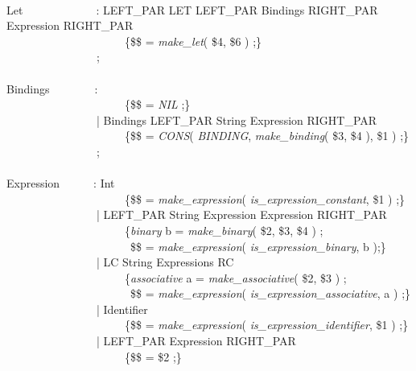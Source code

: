 \begin{pgm}
 \\
Let~~~~~~~~~~~~~: LEFT\_PAR LET LEFT\_PAR Bindings 
                                RIGHT\_PAR Expression RIGHT\_PAR \\
~~~~~~~~~~~~~~~~~~~~~\{\$\$ = {\sl make\_let}( \$4, \$6 ) ;\} \\
~~~~~~~~~~~~~~~~; \\
 \\
Bindings~~~~~~~~: \\
~~~~~~~~~~~~~~~~~~~~~\{\$\$ = {\sl NIL} ;\} \\
~~~~~~~~~~~~~~~~| Bindings LEFT\_PAR String Expression RIGHT\_PAR  \\
~~~~~~~~~~~~~~~~~~~~~\{\$\$ = {\sl CONS}( {\sl BINDING}, 
                                {\sl make\_binding}( \$3, \$4 ), \$1 ) ;\} \\
~~~~~~~~~~~~~~~~; \\
 \\
Expression~~~~~~: Int \\
~~~~~~~~~~~~~~~~~~~~~\{\$\$ = {\sl make\_expression}( 
                                {\sl is\_expression\_constant}, \$1 ) ;\} \\
~~~~~~~~~~~~~~~~| LEFT\_PAR String Expression Expression RIGHT\_PAR  \\
~~~~~~~~~~~~~~~~~~~~~\{{\sl binary} b = 
                                {\sl make\_binary}( \$2, \$3, \$4 ) ; \\
~~~~~~~~~~~~~~~~~~~~~~\$\$ = {\sl make\_expression}( 
                                {\sl is\_expression\_binary}, b );\} \\
~~~~~~~~~~~~~~~~| LC String Expressions RC  \\
~~~~~~~~~~~~~~~~~~~~~\{{\sl associative} a = 
                                {\sl make\_associative}( \$2, \$3 ) ; \\
~~~~~~~~~~~~~~~~~~~~~~\$\$ = {\sl make\_expression}( 
                                {\sl is\_expression\_associative}, a ) ;\} \\
~~~~~~~~~~~~~~~~| Identifier  \\
~~~~~~~~~~~~~~~~~~~~~\{\$\$ = {\sl make\_expression}(
                                {\sl is\_expression\_identifier}, \$1 ) ;\} \\
~~~~~~~~~~~~~~~~| LEFT\_PAR Expression RIGHT\_PAR  \\
~~~~~~~~~~~~~~~~~~~~~\{\$\$ = \$2 ;\} \\

\end{pgm}
